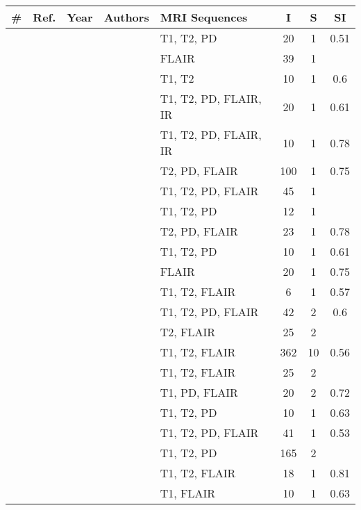 \newcommand{\citefortable}[1]{%
  \stepcounter{papercount}{\thepapercount}&{\cite{#1}}&{\citeyear{#1}}&{\citeauthor{#1}}}
{
\begin{tabular}{cccllccc}
  \hline
  \# & Ref. & Year & Authors & MRI Sequences & I & S & SI \\
  \hline
  \citefortable{VanLeemput2001} & T1, T2, PD & 20 & 1 & 0.51 \\
    \citefortable{Jack2001} & FLAIR & 39 & 1 &  \\
    \citefortable{Zijdenbos2002} & T1, T2 & 10 & 1 & 0.6 \\
    \citefortable{Anbeek2004} & T1, T2, PD, FLAIR, IR & 20 & 1 & 0.61 \\
    \citefortable{Anbeek2005} & T1, T2, PD, FLAIR, IR & 10 & 1 & 0.78 \\
    \citefortable{Admiraal-Behloul2005} & T2, PD, FLAIR & 100 & 1 & 0.75 \\
    \citefortable{Lao2006} & T1, T2, PD, FLAIR & 45 & 1 &  \\
    \citefortable{Wu2006} & T1, T2, PD & 12 & 1 &  \\
    \citefortable{Sajja2006} & T2, PD, FLAIR & 23 & 1 & 0.78 \\
    \citefortable{Harmouche2006} & T1, T2, PD & 10 & 1 & 0.61 \\
    \citefortable{Khayati2008} & FLAIR & 20 & 1 & 0.75 \\
    \citefortable{Wels2008} & T1, T2, FLAIR & 6 & 1 & 0.57 \\
    \citefortable{Herskovits2008} & T1, T2, PD, FLAIR & 42 & 2 & 0.6 \\
    \citefortable{Bricq2008} & T2, FLAIR & 25 & 2 &  \\
    \citefortable{Dyrby2008} & T1, T2, FLAIR & 362 & 10 & 0.56 \\
    \citefortable{Souplet2008} & T1, T2, FLAIR & 25 & 2 &  \\
    \citefortable{DeBoer2009b} & T1, PD, FLAIR & 20 & 2 & 0.72 \\
    \citefortable{Garcia-Lorenzo2009} & T1, T2, PD & 10 & 1 & 0.63 \\
    \citefortable{Akselrod-Ballin2009} & T1, T2, PD, FLAIR & 41 & 1 & 0.53 \\
    \citefortable{Schwarz2009} & T1, T2, PD & 165 & 2 &  \\
    \citefortable{Gibson2010} & T1, T2, FLAIR & 18 & 1 & 0.81 \\
    \citefortable{Shiee2010} & T1, FLAIR & 10 & 1 & 0.63 \\

\end{tabular}}
